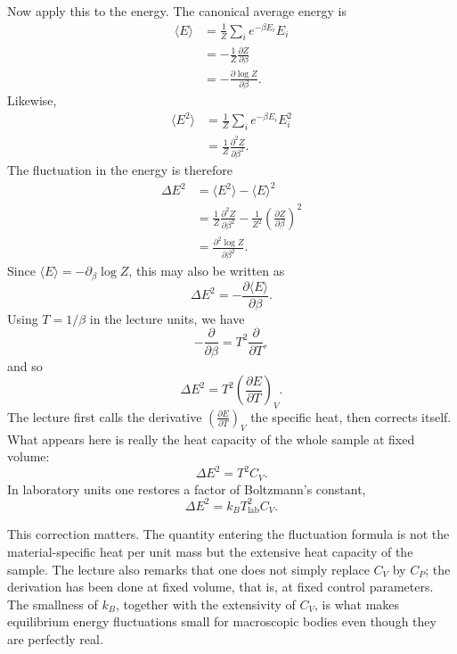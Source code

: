 Now apply this to the energy. The canonical average energy is
\begin{align}
\langle E\rangle
&=
\frac{1}{Z}\sum_i e^{-\beta E_i} E_i \\
&=
-\frac{1}{Z}\frac{\partial Z}{\partial \beta} \\
&=
-\frac{\partial \log Z}{\partial \beta}.
\end{align}
Likewise,
\begin{align}
\langle E^2\rangle
&=
\frac{1}{Z}\sum_i e^{-\beta E_i} E_i^2 \\
&=
\frac{1}{Z}\frac{\partial^2 Z}{\partial \beta^2}.
\end{align}
The fluctuation in the energy is therefore
\begin{align}
\Delta E^2
&=
\langle E^2\rangle - \langle E\rangle^2 \\
&=
\frac{1}{Z}\frac{\partial^2 Z}{\partial \beta^2}
-
\frac{1}{Z^2}\left(\frac{\partial Z}{\partial \beta}\right)^2 \\
&=
\frac{\partial^2 \log Z}{\partial \beta^2}.
\end{align}
Since \(\langle E\rangle = -\partial_\beta \log Z\), this may also be written as
\begin{equation}
\Delta E^2 = -\frac{\partial \langle E\rangle}{\partial \beta}.
\end{equation}
Using \(T=1/\beta\) in the lecture units, we have
\begin{equation}
-\frac{\partial}{\partial \beta}
=
T^2 \frac{\partial}{\partial T},
\end{equation}
and so
\begin{equation}
\Delta E^2
=
T^2\left(\frac{\partial E}{\partial T}\right)_V.
\end{equation}
The lecture first calls the derivative \(\left(\frac{\partial E}{\partial T}\right)_V\) the specific heat, then corrects itself. What appears here is really the heat capacity of the whole sample at fixed volume:
\begin{equation}
\Delta E^2 = T^2 C_V.
\end{equation}
In laboratory units one restores a factor of Boltzmann's constant,
\begin{equation}
\Delta E^2 = k_B T_{\mathrm{lab}}^2 C_V.
\end{equation}

This correction matters. The quantity entering the fluctuation formula is not the material-specific heat per unit mass but the extensive heat capacity of the sample. The lecture also remarks that one does not simply replace \(C_V\) by \(C_P\); the derivation has been done at fixed volume, that is, at fixed control parameters. The smallness of \(k_B\), together with the extensivity of \(C_V\), is what makes equilibrium energy fluctuations small for macroscopic bodies even though they are perfectly real.

